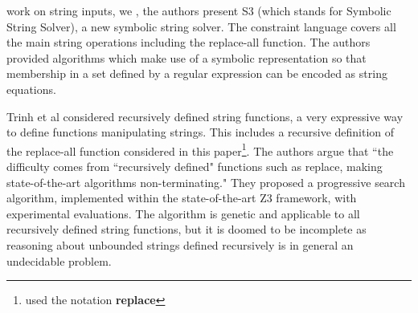 work on string inputs, we 
\cite{TCJ14}, the authors present S3 (which stands for Symbolic String Solver), a new symbolic string solver.
The constraint language covers all the main string operations including the replace-all function. The authors 
provided algorithms which make use of a symbolic representation so that membership in a set defined by a regular expression can be encoded as string equations. 




%



\cite{TCJ16} 
Trinh et al considered %
recursively defined string functions, a very expressive way to define functions manipulating strings. This includes a recursive definition of the replace-all function considered in this paper\footnote{\cite{TCJ16} used the notation \textbf{replace}}. The authors argue that ``the difficulty comes from ``recursively defined" functions such as replace, making state-of-the-art algorithms non-terminating." They proposed a progressive search algorithm, %
implemented within the state-of-the-art Z3 framework, with experimental evaluations. The algorithm is genetic and  applicable to all recursively defined string functions, but it is doomed to be incomplete as reasoning about unbounded strings defined recursively is in general an undecidable problem.   

